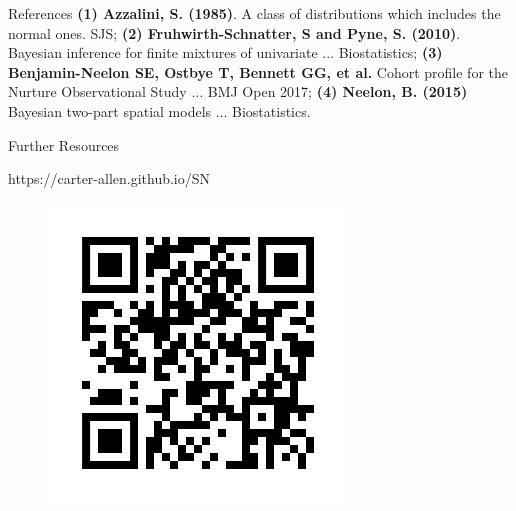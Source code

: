 \documentclass[final]{beamer}
\newlength{\onecolwid}
\begin{document}
\begin{frame}[t]
\begin{columns}[t]
\begin{column}{\onecolwid}
\begin{block}{References}
\tiny  \textbf{(1) Azzalini, S. (1985)}. A class of distributions which includes the normal ones. SJS; \textbf{(2) Fruhwirth-Schnatter, S and Pyne, S. (2010)}. Bayesian inference for finite mixtures of univariate ... Biostatistics; \textbf{(3) Benjamin-Neelon SE, Ostbye T, Bennett GG, et al.} Cohort profile for the Nurture Observational Study ... BMJ Open 2017; \textbf{(4) Neelon, B. (2015)} Bayesian two-part spatial models ... Biostatistics.

\end{block}








\begin{alertblock}{Further Resources}

\centering
https://carter-allen.github.io/SN

\begin{figure}
\includegraphics[width = .2\linewidth]{frame.png}
\end{figure}

\end{alertblock}


\end{column} %

\end{columns} %

\end{frame} %
\end{document}
